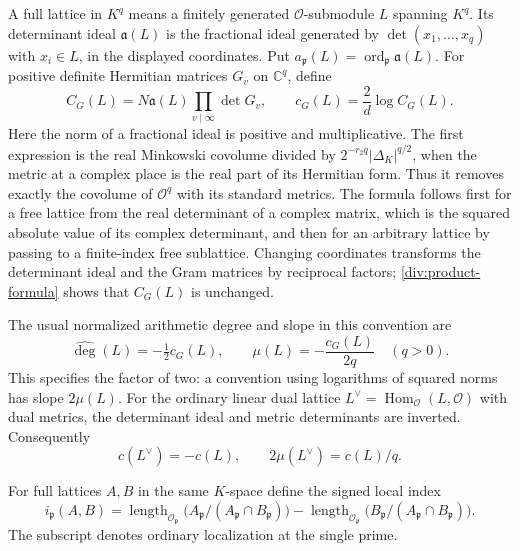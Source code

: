 A full lattice in $K^q$ means a finitely generated $\mathcal O$-submodule
$L$ spanning $K^q$. Its determinant ideal $\mathfrak a(L)$ is the
fractional ideal generated by
$\det(x_1,\ldots,x_q)$ with $x_i\in L$, in the displayed coordinates.
Put $a_{\mathfrak p}(L)=\operatorname{ord}_{\mathfrak p}\mathfrak a(L)$.
For positive definite Hermitian matrices $G_v$ on $\mathbb C^q$, define
\begin{equation}\label{div:covolume}
 C_G(L)=N\mathfrak a(L)\prod_{v\mid\infty}\det G_v,
 \qquad c_G(L)=\frac2d\log C_G(L).
\end{equation}
Here the norm of a fractional ideal is positive and multiplicative.
The first expression is the real Minkowski covolume divided by
$2^{-r_2q}|\Delta_K|^{q/2}$, when the metric at a complex place is
the real part of its Hermitian form. Thus it removes exactly the
covolume of $\mathcal O^q$ with its standard metrics. The formula follows
first for a free lattice from the real determinant of a complex matrix,
which is the squared absolute value of its complex determinant, and then
for an arbitrary lattice by passing to a finite-index free sublattice.
Changing coordinates transforms the determinant ideal and the Gram
matrices by reciprocal factors; \eqref{div:product-formula} shows that
$C_G(L)$ is unchanged.

The usual normalized arithmetic degree and slope in this convention are
\[
 \widehat{\deg}(L)=-\tfrac12c_G(L),\qquad
 \mu(L)=-\frac{c_G(L)}{2q}\quad(q>0).
\]
This specifies the factor of two: a convention using logarithms of
squared norms has slope $2\mu(L)$. For the ordinary linear dual lattice
$L^\vee=\operatorname{Hom}_{\mathcal O}(L,\mathcal O)$ with dual metrics,
the determinant ideal and metric determinants are inverted. Consequently
\begin{equation}\label{div:ordinary-dual}
 c(L^\vee)=-c(L),\qquad 2\mu(L^\vee)=c(L)/q.
\end{equation}

For full lattices $A,B$ in the same $K$-space define the signed local index
\[
 i_{\mathfrak p}(A,B)=
 \operatorname{length}_{\mathcal O_{\mathfrak p}}
       \bigl(A_{\mathfrak p}/(A_{\mathfrak p}\cap B_{\mathfrak p})\bigr)
 -\operatorname{length}_{\mathcal O_{\mathfrak p}}
       \bigl(B_{\mathfrak p}/(A_{\mathfrak p}\cap B_{\mathfrak p})\bigr).
\]
The subscript denotes ordinary localization at the single prime.

